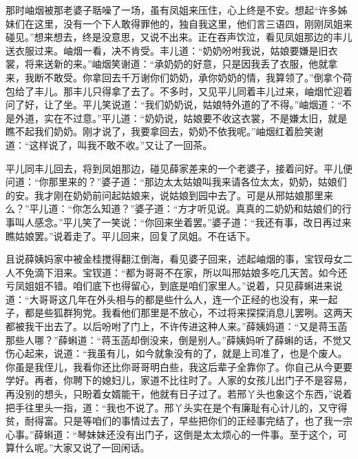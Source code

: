 \begin{parag}
    那时岫烟被那老婆子聒噪了一场，虽有凤姐来压住，心上终是不安。想起“许多姊妹们在这里，没有一个下人敢得罪他的，独自我这里，他们言三语四，刚刚凤姐来碰见。”想来想去，终是没意思，又说不出来。正在吞声饮泣，看见凤姐那边的丰儿送衣服过来。岫烟一看，决不肯受。丰儿道：“奶奶吩咐我说，姑娘要嫌是旧衣裳，将来送新的来。”岫烟笑谢道：“承奶奶的好意，只是因我丢了衣服，他就拿来，我断不敢受。你拿回去千万谢你们奶奶，承你奶奶的情，我算领了。”倒拿个荷包给了丰儿。那丰儿只得拿了去了。不多时，又见平儿同着丰儿过来，岫烟忙迎着问了好，让了坐。平儿笑说道：“我们奶奶说，姑娘特外道的了不得。”岫烟道：“不是外道，实在不过意。”平儿道：“奶奶说，姑娘要不收这衣裳，不是嫌太旧，就是瞧不起我们奶奶。刚才说了，我要拿回去，奶奶不依我呢。”岫烟红着脸笑谢道：“这样说了，叫我不敢不收。”又让了一回茶。
\end{parag}


\begin{parag}
    平儿同丰儿回去，将到凤姐那边，碰见薛家差来的一个老婆子，接着问好。平儿便问道：“你那里来的？”婆子道：“那边太太姑娘叫我来请各位太太，奶奶，姑娘们的安。我才刚在奶奶前问起姑娘来，说姑娘到园中去了。可是从邢姑娘那里来么？”平儿道：“你怎么知道？”婆子道：“方才听见说。真真的二奶奶和姑娘们的行事叫人感念。”平儿笑了一笑说：“你回来坐着罢。”婆子道：“我还有事，改日再过来瞧姑娘罢。”说着走了。平儿回来，回复了凤姐。不在话下。
\end{parag}


\begin{parag}
    且说薛姨妈家中被金桂搅得翻江倒海，看见婆子回来，述起岫烟的事，宝钗母女二人不免滴下泪来。宝钗道：“都为哥哥不在家，所以叫邢姑娘多吃几天苦。如今还亏凤姐姐不错。咱们底下也得留心，到底是咱们家里人。”说着，只见薛蝌进来说道：“大哥哥这几年在外头相与的都是些什么人，连一个正经的也没有，来一起子，都是些狐群狗党。我看他们那里是不放心，不过将来探探消息儿罢咧。这两天都被我干出去了。以后吩咐了门上，不许传进这种人来。”薛姨妈道：“又是蒋玉菡那些人哪？”薛蝌道：“蒋玉菡却倒没来，倒是别人。”薛姨妈听了薛蝌的话，不觉又伤心起来，说道：“我虽有儿，如今就象没有的了，就是上司准了，也是个废人。你虽是我侄儿，我看你还比你哥哥明白些，我这后辈子全靠你了。你自己从今更要学好。再者，你聘下的媳妇儿，家道不比往时了。人家的女孩儿出门子不是容易，再没别的想头，只盼着女婿能干，他就有日子过了。若邢丫头也象这个东西，”说着把手往里头一指，道：“我也不说了。邢丫头实在是个有廉耻有心计儿的，又守得贫，耐得富。只是等咱们的事情过去了，早些把你们的正经事完结了，也了我一宗心事。”薛蝌道：“琴妹妹还没有出门子，这倒是太太烦心的一件事。至于这个，可算什么呢。”大家又说了一回闲话。
\end{parag}


